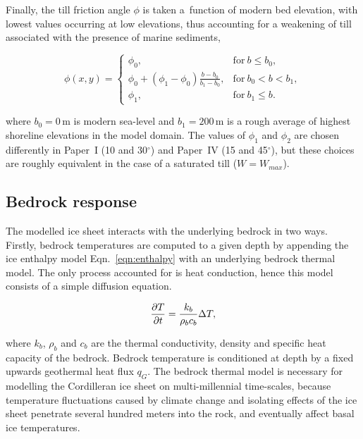 \documentclass{article}
\newcommand{\eqn}[1]{Eqn.~\ref{eqn:#1}}
\begin{document}
Finally, the till friction angle $\phi$ is taken a~function of modern bed
elevation, with lowest values occurring at low elevations, thus accounting for
a weakening of till associated with the presence of marine sediments,

\begin{equation}
  \phi(x,y) =
  \begin{cases}
    \phi_0, & \mathrm{for}\ b \le b_0, \\
    \phi_0 + (\phi_1-\phi_0) \frac{b - b_0}{b_1-b_0},
        & \mathrm{for}\ b_0 < b < b_1, \\
    \phi_1, & \mathrm{for}\ b_1 \le b.
  \end{cases}
  \label{eq:phipiecewise}
\end{equation}

where $b_0=0$\,m is modern sea-level and $b_1=200$\,m is a rough average of
highest shoreline elevations in the model domain. The values of $\phi_1$ and
$\phi_2$ are chosen differently in Paper~I (10 and 30$^\circ$) and Paper~IV
(15 and 45$^\circ$), but these choices are roughly equivalent in the case of a
saturated till ($W=W_{max}$).

\subsection{Bedrock response}

The modelled ice sheet interacts with the underlying bedrock in two ways.
Firstly, bedrock temperatures are computed to a given depth by appending the
ice enthalpy model \eqn{enthalpy} with an underlying bedrock thermal model.
The only process accounted for is heat conduction, hence this model consists of
a simple diffusion equation.

\begin{equation}
    \pdv{T}{t} = \frac{k_b}{\rho_b c_b} \Delta T,
\end{equation}

where $k_b$, $\rho_b$ and $c_b$ are the thermal conductivity, density and
specific heat capacity of the bedrock. Bedrock temperature is conditioned at
depth by a fixed upwards geothermal heat flux $q_G$. The bedrock thermal model
is necessary for modelling the Cordilleran ice sheet on multi-millennial
time-scales, because temperature fluctuations caused by climate change and
isolating effects of the ice sheet penetrate several hundred meters into the
rock, and eventually affect basal ice temperatures.
\end{document}
